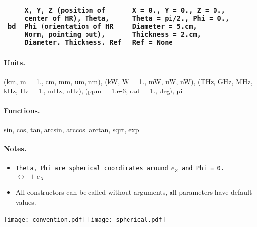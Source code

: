 \documentclass[a4paper, landscape]{article}
\begin{document}
\begin{tabular}{| p{.6cm} | p{7cm}| p{6cm} | p{5cm} |}
\tt{bd} & \tt{X}, \tt{Y}, \tt{Z} (position of center of HR), \tt{Theta}, \tt{Phi} (orientation of HR Norm, pointing out), \tt{Diameter},  \tt{Thickness}, \tt{Ref} & \tt{X}~=~0., \tt{Y}~=~0., \tt{Z}~=~0., \tt{Theta}~=~pi/2., \tt{Phi}~=~0., \tt{Diameter}~=~5.cm,  \tt{Thickness}~=~2.cm,  \tt{Ref}~=~None & \\ \hline

\end{tabular}

\begin{multicols}{2}

\paragraph{Units.}(km, m = 1., cm, mm, um, nm), (kW, W = 1., mW, uW, nW), (THz, GHz, MHz, kHz, Hz = 1., mHz, uHz), (ppm = 1.e-6, rad = 1., deg), pi
\paragraph{Functions.} sin, cos, tan, arcsin, arccos, arctan, sqrt, exp

\paragraph{Notes.}\begin{itemize}
\item \tt{Theta}, \tt{Phi} are spherical coordinates around $e_Z$ and \tt{Phi = 0.} $\leftrightarrow~ + e_X$
\item All constructors can be called without arguments, all parameters have default values.
\end{itemize}

\texttt{[image: convention.pdf]}
\texttt{[image: spherical.pdf]}



\end{multicols}
\end{document}
